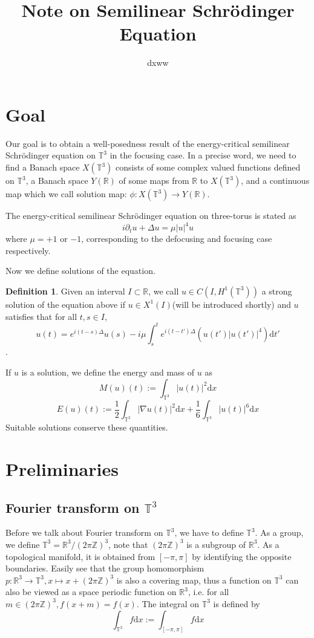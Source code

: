 \documentclass{article}
\title{Note on Semilinear Schr\"odinger Equation}
\author{dxww}
\theoremstyle{definition}
\newtheorem{definition}{Definition}[subsection]
\theoremstyle{remark}
\newcommand{\dif}{\mathrm{d}}
\begin{document}
\maketitle

\section{Goal}
Our goal is to obtain a well-posedness result of the energy-critical semilinear Schr\"odinger equation on $\mathbb{T}^3$ in the focusing case. In a precise word, we need to find a Banach space $X(\mathbb{T}^3)$ consists of some complex valued functions defined on $\mathbb{T}^3$, a Banach space $Y(\mathbb{R})$ of some maps from $\mathbb{R}$ to $X(\mathbb{T}^3)$, and a continuous map which we call solution map: $\phi:X(\mathbb{T}^3)\rightarrow Y(\mathbb{R})$. 

The energy-critical semilinear Schr\"odinger equation on three-torus is stated as 
$$i\partial_tu+\Delta u=\mu|u|^4u$$
where $\mu=+1$ or $-1$, corresponding to the defocusing and focusing case respectively. 

Now we define solutions of the equation. 

\begin{definition}
Given an interval $I\subset\mathbb{R}$, we call $u\in C(I,H^1(\mathbb{T}^3))$ a strong solution of the equation above if $u\in X^1(I)$(will be introduced shortly) and $u$ satisfies that for all $t,s\in I$, 
$$u(t)=e^{i(t-s)\Delta}u(s)-i\mu\int_s^te^{i(t-t')\Delta}(u(t')|u(t')|^4)\dif t'$$. 
\end{definition}

If $u$ is a solution, we define the energy and mass of $u$ as 
$$M(u)(t):=\int_{\mathbb{T}^3}|u(t)|^2\dif x$$
$$E(u)(t):=\frac{1}{2}\int_{\mathbb{T}^3}|\nabla u(t)|^2\dif x+\frac{1}{6}\int_{\mathbb{T}^3}|u(t)|^6\dif x$$
Suitable solutions conserve these quantities. 

\section{Preliminaries}
\subsection{Fourier transform on $\mathbb{T}^3$}
Before we talk about Fourier transform on $\mathbb{T}^3$, we have to define $\mathbb{T}^3$. As a group, we define $\mathbb{T}^3=\mathbb{R}^3/(2\pi\mathbb{Z})^3$, note that $(2\pi\mathbb{Z})^3$ is a subgroup of $\mathbb{R}^3$. As a topological manifold, it is obtained from $[-\pi,\pi]$ by identifying the opposite boundaries. Easily see that the group homomorphism $p:\mathbb{R}^3\rightarrow\mathbb{T}^3,x\mapsto x+(2\pi\mathbb{Z})^3$ is also a covering map, thus a function on $\mathbb{T}^3$ can also be viewed as a space periodic function on $\mathbb{R}^3$, i.e. for all $m\in(2\pi\mathbb{Z})^3,f(x+m)=f(x)$. The integral on $\mathbb{T}^3$ is defined by
$$\int_{\mathbb{T}^3}f\dif x:=\int_{[-\pi,\pi]}f\dif x$$
\end{document}
